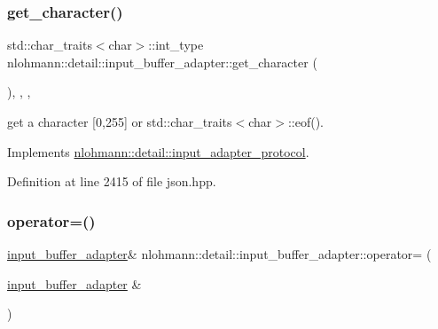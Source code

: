 \subsubsection{\texorpdfstring{get\_character()}{get\_character()}}
{\footnotesize\ttfamily std\+::char\+\_\+traits$<$char$>$\+::int\+\_\+type nlohmann\+::detail\+::input\+\_\+buffer\+\_\+adapter\+::get\+\_\+character (\begin{DoxyParamCaption}{ }\end{DoxyParamCaption})\hspace{0.3cm}{\ttfamily [inline]}, {\ttfamily [override]}, {\ttfamily [virtual]}, {\ttfamily [noexcept]}}



get a character \mbox{[}0,255\mbox{]} or std\+::char\+\_\+traits$<$char$>$\+::eof(). 



Implements \mbox{\hyperlink{structnlohmann_1_1detail_1_1input__adapter__protocol_aac10a6a4048a8ce8e2ed50277692a3ca}{nlohmann\+::detail\+::input\+\_\+adapter\+\_\+protocol}}.



Definition at line 2415 of file json.\+hpp.

\mbox{\label{classnlohmann_1_1detail_1_1input__buffer__adapter_a0871125057d993684ba8e45fb2b8a76b}} 
\subsubsection{\texorpdfstring{operator=()}{operator=()}\hspace{0.1cm}{\footnotesize\ttfamily [1/2]}}
{\footnotesize\ttfamily \mbox{\hyperlink{classnlohmann_1_1detail_1_1input__buffer__adapter}{input\+\_\+buffer\+\_\+adapter}}\& nlohmann\+::detail\+::input\+\_\+buffer\+\_\+adapter\+::operator= (\begin{DoxyParamCaption}\item[{\mbox{\hyperlink{classnlohmann_1_1detail_1_1input__buffer__adapter}{input\+\_\+buffer\+\_\+adapter}} \&}]{ }\end{DoxyParamCaption})\hspace{0.3cm}{\ttfamily [delete]}}

\mbox{\label{classnlohmann_1_1detail_1_1input__buffer__adapter_a19bb3ff68048a2fc8ecc41a013af37ae}} 
